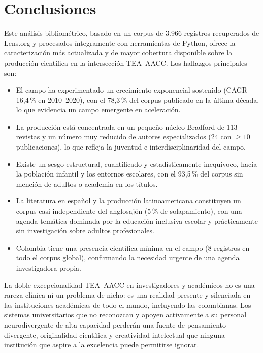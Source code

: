 \documentclass[12pt, a4paper]{article}
\begin{document}
\section{Conclusiones}
\label{sec:conclusiones}

Este análisis bibliométrico, basado en un corpus de 3.966 registros recuperados de
Lens.org y procesados íntegramente con herramientas de Python, ofrece la
caracterización más actualizada y de mayor cobertura disponible sobre la producción
científica en la intersección TEA--AACC. Los hallazgos principales son:

\begin{itemize}[leftmargin=*, itemsep=3pt]
    \item El campo ha experimentado un crecimiento exponencial sostenido (CAGR
    16,4\,\% en 2010--2020), con el 78,3\,\% del corpus publicado en la última
    década, lo que evidencia un campo emergente en aceleración.

    \item La producción está concentrada en un pequeño núcleo Bradford de 113
    revistas y un número muy reducido de autores especializados (24 con $\geq10$
    publicaciones), lo que refleja la juventud e interdisciplinaridad del campo.

    \item Existe un sesgo estructural, cuantificado y estadísticamente inequívoco,
    hacia la población infantil y los entornos escolares, con el 93,5\,\% del corpus
    sin mención de adultos o academia en los títulos.

    \item La literatura en español y la producción latinoamericana constituyen
    un corpus casi independiente del anglosajón (5\,\% de solapamiento), con
    una agenda temática dominada por la educación inclusiva escolar y prácticamente
    sin investigación sobre adultos profesionales.

    \item Colombia tiene una presencia científica mínima en el campo (8 registros
    en todo el corpus global), confirmando la necesidad urgente de una agenda
    investigadora propia.
\end{itemize}

La doble excepcionalidad TEA--AACC en investigadores y académicos no es una
rareza clínica ni un problema de nicho: es una realidad presente y silenciada en
las instituciones académicas de todo el mundo, incluyendo las colombianas. Los
sistemas universitarios que no reconozcan y apoyen activamente a su personal
neurodivergente de alta capacidad perderán una fuente de pensamiento divergente,
originalidad científica y creatividad intelectual que ninguna institución que
aspire a la excelencia puede permitirse ignorar.
\end{document}
